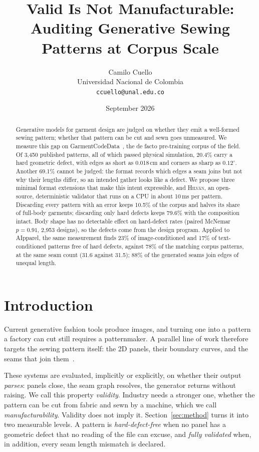 \documentclass[10pt,twocolumn]{article}
\title{\bfseries Valid Is Not Manufacturable:\\
Auditing Generative Sewing Patterns at Corpus Scale}
\author{Camilo Cuello \\
\small Universidad Nacional de Colombia \todo{department, to confirm with the author} \\
\small\texttt{ccuello@unal.edu.co}}
\date{September 2026}
\newcommand{\hilvan}{\textsc{Hilv\'an}}
\begin{document}
\maketitle

\begin{abstract}
Generative models for garment design are judged on whether they emit a
well-formed sewing pattern; whether that pattern can be cut and sewn goes
unmeasured. We measure this gap on GarmentCodeData~\citep{gcdata}, the de facto pre-training corpus of
the field. Of 3{,}450 published patterns, all of which passed physical
simulation, 20.4\% carry a hard geometric defect, with edges as short as
0.018\,cm and corners as sharp as $0.12^\circ$. Another 69.1\% cannot be judged:
the format records which edges a seam joins but not why their lengths differ,
so an intended gather looks like a defect. We propose three minimal format
extensions that make this intent expressible, and \hilvan, an open-source,
deterministic validator that runs on a CPU in about 10\,ms per pattern.
Discarding every pattern with an error keeps 10.5\% of the corpus and halves
its share of full-body garments; discarding only hard defects keeps 79.6\% with
the composition intact. Body shape has no detectable effect on hard-defect rates
(paired McNemar $p = 0.91$, 2{,}953 designs), so the defects come from the
design program. Applied to AIpparel, the same measurement finds 23\% of
image-conditioned and 17\% of text-conditioned patterns free of hard defects,
against 78\% of the matching corpus patterns, at the same seam count (31.6
against 31.5); 88\% of the generated seams join edges of unequal length.
\end{abstract}

\section{Introduction}

Current generative fashion tools produce images, and turning one into a
pattern a factory can cut still requires a patternmaker. A parallel line of
work therefore targets the sewing pattern itself: the 2D panels, their boundary
curves, and the seams that join
them~\citep{garmentcode,chatgarment,aipparel,sewingldm}.

These systems are evaluated, implicitly or explicitly, on whether their output
\emph{parses}: panels close, the seam graph resolves, the generator returns
without raising. We call this property \emph{validity}. Industry needs a
stronger one, whether the pattern can be cut from fabric and sewn by a machine,
which we call \emph{manufacturability}. Validity does not imply it.
Section~\ref{sec:method} turns it into two measurable levels. A pattern is
\emph{hard-defect-free} when no panel has a geometric defect that no reading of
the file can excuse, and \emph{fully validated} when, in addition, every seam
length mismatch is declared.
\end{document}
